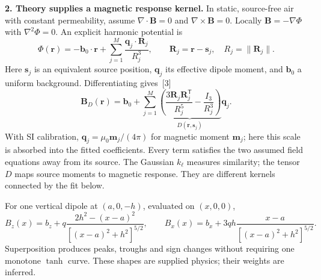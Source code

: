 \documentclass[11pt,letterpaper]{article}
\begin{document}
\textbf{2. Theory supplies a magnetic response kernel.}
In static, source-free air with constant permeability, assume
$\nabla\cdot\mathbf B=0$ and $\nabla\times\mathbf B=0$.
Locally $\mathbf B=-\nabla\Phi$ with $\nabla^2\Phi=0$. An explicit harmonic potential is
\begin{equation}
\Phi(\mathbf r)=-\mathbf b_0\cdot\mathbf r+
\sum_{j=1}^{M}\frac{\mathbf q_j\cdot\mathbf R_j}{R_j^3},
\qquad \mathbf R_j=\mathbf r-\mathbf s_j,\quad R_j=\|\mathbf R_j\|.
\label{eq:potential}
\end{equation}
Here $\mathbf s_j$ is an equivalent source position, $\mathbf q_j$ its effective
dipole moment, and $\mathbf b_0$ a uniform background. Differentiating gives~[3]
\begin{equation}
\boxed{\ \mathbf B_D(\mathbf r)=\mathbf b_0+
\sum_{j=1}^{M}\underbrace{\left(
\frac{3\mathbf R_j\mathbf R_j^{\mathsf T}}{R_j^5}
-\frac{I_3}{R_j^3}\right)}_{\displaystyle D(\mathbf r,\mathbf s_j)}\mathbf q_j.\ }
\label{eq:dipoles}
\end{equation}
With SI calibration, $\mathbf q_j=\mu_0\mathbf m_j/(4\pi)$ for magnetic moment
$\mathbf m_j$; here this scale is absorbed into the fitted coefficients.
Every term satisfies the two assumed field equations away from its source.
The Gaussian $k_\ell$ measures similarity; the tensor $D$ maps source moments to
magnetic response. They are different kernels connected by the fit below.

For one vertical dipole at $(a,0,-h)$, evaluated on $(x,0,0)$,
\begin{equation}
B_z(x)=b_z+q\frac{2h^2-(x-a)^2}{[(x-a)^2+h^2]^{5/2}},\qquad
B_x(x)=b_x+3qh\frac{x-a}{[(x-a)^2+h^2]^{5/2}}.
\label{eq:shapes}
\end{equation}
Superposition produces peaks, troughs and sign changes without requiring one
monotone $\tanh$ curve. These shapes are supplied physics; their weights are inferred.
\end{document}
